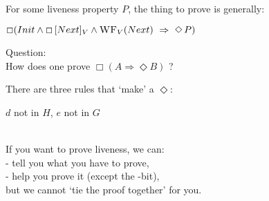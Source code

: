 {
For some liveness property $P$,  the thing to prove is generally:
\vspace{25pt}
\begin{theorem}[Liveness]
\begin{center}
$\Box (Init \wedge \Box\, [Next]_V  \wedge \kw{WF}_V (Next) \  \Rightarrow \ \Diamond\, P)$
\end{center}
\end{theorem}
\vspace{20pt}
{\color{Maroon} Question:} \\
\hfill How does one prove  $\Box( A \Rightarrow \Diamond B)$ ?
\vspace{27pt}
}



{
\hspace{-18pt} {\color{Maroon}There are three rules that `make' a $\Diamond$:}
\vspace{15pt}     
\footnotesize
\begin{rl}
\begin{prooftree}
\end{prooftree}
\end{rl}

\vspace{20pt}

\begin{rl}[Lattice]
\begin{prooftree}
\end{prooftree}
\scriptsize
\hfill $d$ not in $H$, $e$ not in $G$
\end{rl}
\vspace{45pt}

}


{
\\
\vspace{25pt}
If you want to prove liveness, we can:\\
\hspace{25pt} - tell you what you have to prove, \\
\hspace{25pt} - help you prove it (except the \enabled-bit),\\
\vspace{15pt}
\hfill but we cannot `tie the proof together' for you. 


}




